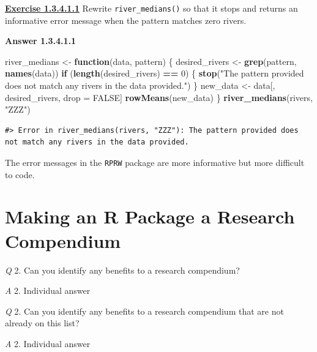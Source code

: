 \documentclass[
]{book}
\newenvironment{Shaded}{\begin{snugshade}}{\end{snugshade}}
\newcommand{\ControlFlowTok}[1]{\textcolor[rgb]{0.13,0.29,0.53}{\textbf{#1}}}
\newcommand{\DecValTok}[1]{\textcolor[rgb]{0.00,0.00,0.81}{#1}}
\newcommand{\KeywordTok}[1]{\textcolor[rgb]{0.13,0.29,0.53}{\textbf{#1}}}
\newcommand{\NormalTok}[1]{#1}
\newcommand{\OperatorTok}[1]{\textcolor[rgb]{0.81,0.36,0.00}{\textbf{#1}}}
\newcommand{\OtherTok}[1]{\textcolor[rgb]{0.56,0.35,0.01}{#1}}
\newcommand{\StringTok}[1]{\textcolor[rgb]{0.31,0.60,0.02}{#1}}
\begin{document}
\textbf{\protect\hyperlink{ex-set6}{Exercise 1.3.4.1.1}}
Rewrite \texttt{river\_medians()} so that it stops and returns an informative error message when the pattern matches zero rivers.

\textbf{Answer 1.3.4.1.1}

\begin{Shaded}
\begin{Highlighting}[]
\NormalTok{river_medians <-}\StringTok{ }\ControlFlowTok{function}\NormalTok{(data, pattern) \{}
\NormalTok{  desired_rivers <-}\StringTok{ }\KeywordTok{grep}\NormalTok{(pattern, }\KeywordTok{names}\NormalTok{(data))}
  \ControlFlowTok{if}\NormalTok{ (}\KeywordTok{length}\NormalTok{(desired_rivers) }\OperatorTok{==}\StringTok{ }\DecValTok{0}\NormalTok{) \{}
    \KeywordTok{stop}\NormalTok{(}\StringTok{"The pattern provided does not match any rivers in the data provided."}\NormalTok{)}
\NormalTok{  \}}
\NormalTok{  new_data <-}\StringTok{ }\NormalTok{data[, desired_rivers, drop =}\StringTok{ }\OtherTok{FALSE}\NormalTok{]}
  \KeywordTok{rowMeans}\NormalTok{(new_data)}
\NormalTok{\}}
\KeywordTok{river_medians}\NormalTok{(rivers, }\StringTok{"ZZZ"}\NormalTok{)}
\end{Highlighting}
\end{Shaded}

\begin{verbatim}
#> Error in river_medians(rivers, "ZZZ"): The pattern provided does not match any rivers in the data provided.
\end{verbatim}

The error messages in the \texttt{RPRW} package are more informative but more difficult to code.

\hypertarget{making-an-r-package-a-research-compendium}{%
\section*{Making an R Package a Research Compendium}\label{making-an-r-package-a-research-compendium}}

\emph{Q} 2. Can you identify any benefits to a research compendium?

\emph{A} 2. Individual answer

\emph{Q} 2. Can you identify any benefits to a research compendium that are not already on this list?

\emph{A} 2. Individual answer

  
\end{document}
